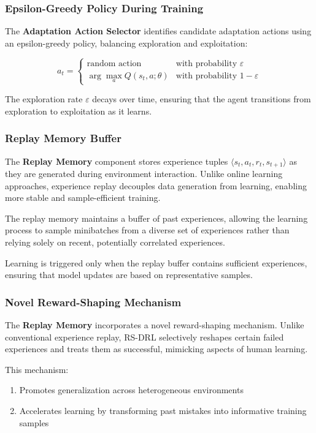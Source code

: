 \documentclass[11pt,a4paper]{article}
\begin{document}
\subsubsection{Epsilon-Greedy Policy During Training}

The \textbf{Adaptation Action Selector} identifies candidate adaptation actions using an epsilon-greedy policy, balancing exploration and exploitation:

\[
a_t = \begin{cases}
\text{random action} & \text{with probability } \varepsilon \\
\arg\max_{a} Q(s_t, a; \theta) & \text{with probability } 1-\varepsilon
\end{cases}
\]

The exploration rate $\varepsilon$ decays over time, ensuring that the agent transitions from exploration to exploitation as it learns.

\subsubsection{Replay Memory Buffer}

The \textbf{Replay Memory} component stores experience tuples $\langle s_t, a_t, r_t, s_{t+1} \rangle$ as they are generated during environment interaction. Unlike online learning approaches, experience replay decouples data generation from learning, enabling more stable and sample-efficient training.

The replay memory maintains a buffer of past experiences, allowing the learning process to sample minibatches from a diverse set of experiences rather than relying solely on recent, potentially correlated experiences.

Learning is triggered only when the replay buffer contains sufficient experiences, ensuring that model updates are based on representative samples.

\subsubsection{Novel Reward-Shaping Mechanism}

The \textbf{Replay Memory} incorporates a novel reward-shaping mechanism. Unlike conventional experience replay, RS-DRL selectively reshapes certain failed experiences and treats them as successful, mimicking aspects of human learning.

This mechanism:
\begin{enumerate}
    \item Promotes generalization across heterogeneous environments
    \item Accelerates learning by transforming past mistakes into informative training samples
\end{enumerate}
\end{document}
